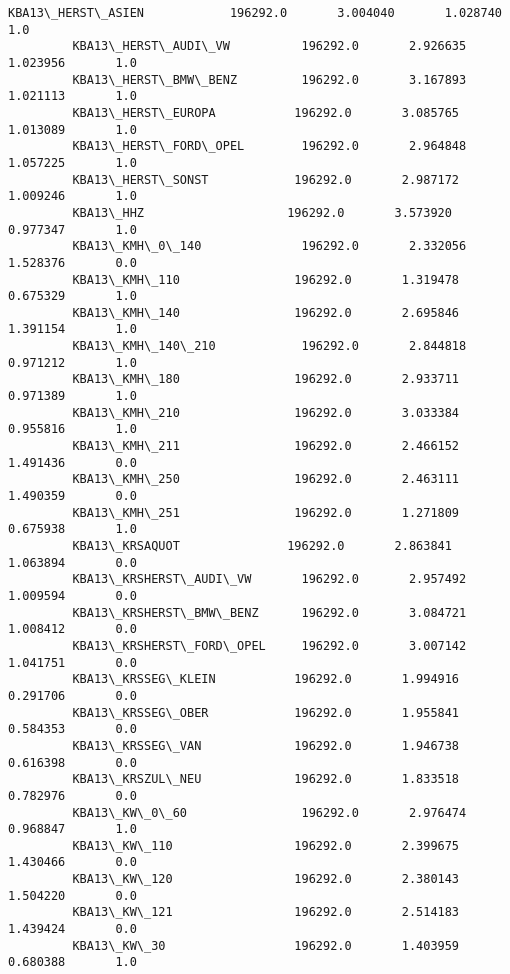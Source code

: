 \documentclass[11pt]{article}
\begin{document}
\begin{Verbatim}[commandchars=\\\{\}]
         KBA13\_HERST\_ASIEN            196292.0       3.004040       1.028740       1.0   
         KBA13\_HERST\_AUDI\_VW          196292.0       2.926635       1.023956       1.0   
         KBA13\_HERST\_BMW\_BENZ         196292.0       3.167893       1.021113       1.0   
         KBA13\_HERST\_EUROPA           196292.0       3.085765       1.013089       1.0   
         KBA13\_HERST\_FORD\_OPEL        196292.0       2.964848       1.057225       1.0   
         KBA13\_HERST\_SONST            196292.0       2.987172       1.009246       1.0   
         KBA13\_HHZ                    196292.0       3.573920       0.977347       1.0   
         KBA13\_KMH\_0\_140              196292.0       2.332056       1.528376       0.0   
         KBA13\_KMH\_110                196292.0       1.319478       0.675329       1.0   
         KBA13\_KMH\_140                196292.0       2.695846       1.391154       1.0   
         KBA13\_KMH\_140\_210            196292.0       2.844818       0.971212       1.0   
         KBA13\_KMH\_180                196292.0       2.933711       0.971389       1.0   
         KBA13\_KMH\_210                196292.0       3.033384       0.955816       1.0   
         KBA13\_KMH\_211                196292.0       2.466152       1.491436       0.0   
         KBA13\_KMH\_250                196292.0       2.463111       1.490359       0.0   
         KBA13\_KMH\_251                196292.0       1.271809       0.675938       1.0   
         KBA13\_KRSAQUOT               196292.0       2.863841       1.063894       0.0   
         KBA13\_KRSHERST\_AUDI\_VW       196292.0       2.957492       1.009594       0.0   
         KBA13\_KRSHERST\_BMW\_BENZ      196292.0       3.084721       1.008412       0.0   
         KBA13\_KRSHERST\_FORD\_OPEL     196292.0       3.007142       1.041751       0.0   
         KBA13\_KRSSEG\_KLEIN           196292.0       1.994916       0.291706       0.0   
         KBA13\_KRSSEG\_OBER            196292.0       1.955841       0.584353       0.0   
         KBA13\_KRSSEG\_VAN             196292.0       1.946738       0.616398       0.0   
         KBA13\_KRSZUL\_NEU             196292.0       1.833518       0.782976       0.0   
         KBA13\_KW\_0\_60                196292.0       2.976474       0.968847       1.0   
         KBA13\_KW\_110                 196292.0       2.399675       1.430466       0.0   
         KBA13\_KW\_120                 196292.0       2.380143       1.504220       0.0   
         KBA13\_KW\_121                 196292.0       2.514183       1.439424       0.0   
         KBA13\_KW\_30                  196292.0       1.403959       0.680388       1.0   

\end{Verbatim}
\end{document}
